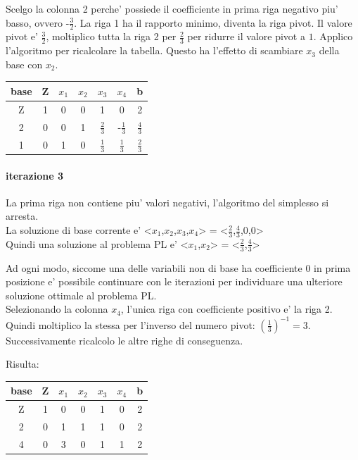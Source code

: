 \documentclass[a4paper,12pt,oneside]{article}
\begin{document}
    Scelgo la colonna 2 perche' possiede il coefficiente in prima riga negativo piu' basso, ovvero -$\frac 3 2$.
    La riga 1 ha il rapporto minimo, diventa la riga pivot.
    Il valore pivot e' $\frac 3 2$, moltiplico tutta la riga 2 per $\frac 2 3$ per ridurre il valore pivot a $1$.
    Applico l'algoritmo per ricalcolare la tabella.
    Questo ha l'effetto di scambiare $x_3$ della base con $x_2$.

    \begin{center}
        \begin{tabular}{|c|c|c|c|c|c|c|}
            \hline
            base & Z & $x_1$ & $x_2$ & $x_3$ & $x_4$ & b\\
            \hline
            Z & 1 & 0 & 0 & 1 & 0 & 2\\
            2 & 0 & 0 & 1 & $\frac 2 3$ & -$\frac 1 3$ & $\frac 4 3$\\
            1 & 0 & 1 & 0 & $\frac 1 3$ & $\frac 1 3$ & $\frac 2 3$\\
            \hline
        \end{tabular}
    \end{center}

    \paragraph{iterazione 3}

    La prima riga non contiene piu' valori negativi, l'algoritmo del simplesso si arresta. \\
    La soluzione di base corrente e' <$x_1$,$x_2$,$x_3$,$x_4$> = <$\frac 2 3$,$\frac 4 3$,0,0> \\
    Quindi una soluzione al problema PL e' <$x_1$,$x_2$> = <$\frac 2 3$,$\frac 4 3$>\*

    Ad ogni modo, siccome una delle variabili non di base ha coefficiente 0 in prima posizione e' possibile continuare con le iterazioni per individuare una ulteriore soluzione ottimale al problema PL. \\

    Selezionando la colonna $x_4$, l'unica riga con coefficiente positivo e' la riga 2. Quindi moltiplico la stessa per l'inverso del numero pivot: $(\frac 1 3)^{-1} = 3$.
    Successivamente ricalcolo le altre righe di conseguenza.

    Risulta:

    \begin{center}
        \begin{tabular}{|c|c|c|c|c|c|c|}
            \hline
            base & Z & $x_1$ & $x_2$ & $x_3$ & $x_4$ & b\\
            \hline
            Z & 1 & 0 & 0 & 1 & 0 & 2\\
            2 & 0 & 1 & 1 & 1 & 0 & 2\\
            4 & 0 & 3 & 0 & 1 & 1 & 2\\
            \hline
        \end{tabular}
    \end{center}
\end{document}
